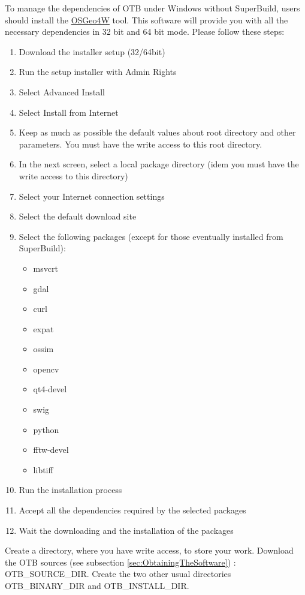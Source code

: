 To manage the dependencies of OTB under Windows without SuperBuild, users should install the \href{http://trac.osgeo.org/osgeo4w/}{OSGeo4W} tool. This software will provide you with all the necessary dependencies in 32 bit and 64 bit mode. Please follow these steps:
\begin{enumerate}
\item  Download the installer setup (32/64bit)
\item  Run the setup installer with Admin Rights
\item  Select Advanced Install
\item  Select Install from Internet
\item  Keep as much as possible the default values about root directory and other parameters. You must have the write access to this root directory. 
\item  In the next screen, select a local package directory (idem you must have the write access to this directory)
\item  Select your Internet connection settings
\item  Select the default download site
\item  Select the following packages (except for those eventually installed from SuperBuild):
	\begin{itemize}
	\item  msvcrt
	\item  gdal
	\item  curl
	\item  expat 
	\item  ossim
	\item  opencv
	\item  qt4-devel
	\item  swig
	\item  python
	\item  fftw-devel
	\item  libtiff
	\end{itemize}
\item  Run the installation process
\item  Accept all the dependencies required by the selected packages
\item  Wait the downloading and the installation of the packages
\end{enumerate}

Create a directory, where you have write access, to store your work.
Download the OTB sources (see subsection \ref{sec:ObtainingTheSoftware}) : OTB\_SOURCE\_DIR.
Create the two other usual directories OTB\_BINARY\_DIR and OTB\_INSTALL\_DIR.

